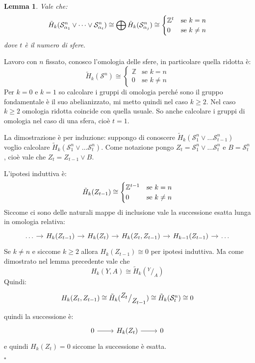 \documentclass[10pt, twoside=false, x11names]{scrbook}
\newtheorem{lemma}[theorem]{Lemma}
\newenvironment{proof}{{\textbf{Dimostrazione}:}}{\hfill $\square$}
\newcommand{\Z}{\mathbb{Z}}
\newcommand{\Sph}[1][]{\mathcal{S}^#1}
\newcommand*\quot[2]{{^{\textstyle #1}\big/_{\textstyle #2}}}
\begin{document}
\begin{lemma}
  Vale che:
  \[
    \tilde{H}_k(\Sph{n}_{\alpha_1} \vee \dots \vee \Sph{n}_{\alpha_t}) \cong \bigoplus \tilde{H}_k(\Sph{n}_{\alpha_j}) \cong
    \begin{cases}
      \Z^t & \text{se $ k = n $} \\
      0 & \text{se $ k \not =  n $}
    \end{cases}
  \]
  dove $ t $ è il numero di sfere.
\end{lemma}
\begin{proof}
  Lavoro con $ n $ fissato, conosco l'omologia delle sfere,
  in particolare quella ridotta è:
  \[
    \tilde{H}_k(\Sph{n}) \cong
    \begin{cases}
      \Z     & \text{se } k = n \\
      0      & \text{se } k \not = n
    \end{cases}
  \]
  Per $ k = 0 $ e $ k = 1 $ so calcolare i gruppi di omologia perché sono
  il gruppo fondamentale è il suo abelianizzato,
  mi metto quindi nel caso $ k \geq 2 $.
  Nel caso $ k \geq 2 $ omologia ridotta coincide con quella usuale.
  So anche calcolare i gruppi di omologia nel caso di una sfera,
  cioè $ t = 1 $.

  La dimostrazione è per induzione:
  suppongo di conoscere $ \tilde{H}_k(\Sph{n}_1 \vee \dots \Sph{n}_{t-1}) $
  voglio calcolare $ \tilde{H}_k(\Sph{n}_1 \vee \dots \Sph{n}_t) $.
  Come notazione pongo $ Z_t = \Sph{n}_1 \vee \dots \Sph{n}_t $ e $ B = \Sph{n}_t $,
  cioè vale che $ Z_t = Z_{t-1} \vee B $.

  L'ipotesi induttiva è:
  \[
    \tilde{H}_k(Z_{t-1}) \cong
    \begin{cases}
      \Z^{t-1} & \text{se $ k = n $} \\
      0 & \text{se $ k \not = n $}
    \end{cases}
  \]
  Siccome ci sono delle naturali mappe di inclusione vale
  la successione esatta lunga in omologia relativa:
  \[
    \begin{tikzcd}[nodes={column sep=10pt}]
      \dots \rar & H_k(Z_{t-1}) \rar & H_k(Z_t) \rar & H_k(Z_t, Z_{t-1}) \rar & H_{k-1}(Z_{t-1}) \rar & \dots
    \end{tikzcd}
  \]
  Se $ k \not = n $ e siccome $ k \geq 2 $ allora $ H_k(Z_{t-1}) \cong 0 $ per ipotesi induttiva.
  Ma come dimostrato nel lemma precedente vale che
  \[
    H_k(Y,A) \cong \tilde{H}_k(\quot{Y}{A})
  \]
  Quindi:
  \[
    \begin{tikzcd}
      H_k(Z_t, Z_{t-1}) \cong \tilde{H}_k(\quot{Z_t}{Z_{t-1}}) \cong \tilde{H}_k(\Sph{n}_t) \cong 0 %
    \end{tikzcd}
  \]
  quindi la successione è:
  \[
    \begin{tikzcd}
      0 \rar   & H_k(Z_t) \rar  & 0
    \end{tikzcd}
  \]
  e quindi $ H_{k}(Z_t) = 0 $ siccome la successione è esatta.


\end{proof}
\end{document}
